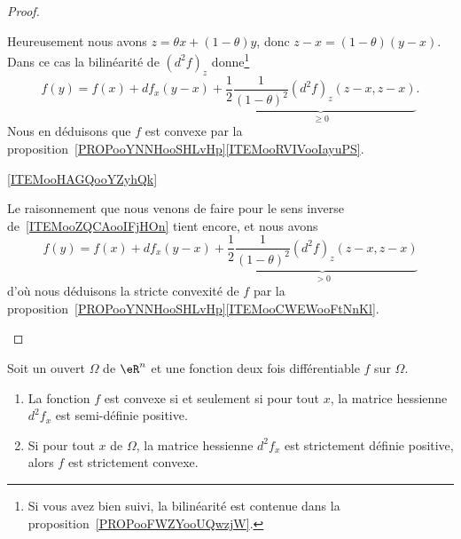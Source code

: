 \begin{proof}
\begin{subproof}
        Heureusement nous avons \( z=\theta x+(1-\theta)y\), donc \( z-x=(1-\theta)(y-x)\). Dans ce cas la bilinéarité de \( (d^2f)_z\) donne\footnote{Si vous avez bien suivi, la bilinéarité est contenue dans la proposition~\ref{PROPooFWZYooUQwzjW}.}
        \begin{equation}
            f(y)=f(x)+df_x(y-x)+\underbrace{\frac{ 1 }{2}\frac{1}{ (1-\theta)^2 }(d^2f)_z(z-x,z-x)}_{\geq 0}.
        \end{equation}
        Nous en déduisons que \( f\) est convexe par la proposition~\ref{PROPooYNNHooSHLvHp}\ref{ITEMooRVIVooIayuPS}.
    \item[\ref{ITEMooHAGQooYZyhQk}]

        Le raisonnement que nous venons de faire pour le sens inverse de~\ref{ITEMooZQCAooIFjHOn} tient encore, et nous avons
        \begin{equation}
            f(y)=f(x)+df_x(y-x)+\underbrace{\frac{ 1 }{2}\frac{1}{ (1-\theta)^2 }(d^2f)_z(z-x,z-x)}_{> 0}
        \end{equation}
        d'où nous déduisons la stricte convexité de \( f\) par la proposition~\ref{PROPooYNNHooSHLvHp}\ref{ITEMooCWEWooFtNnKl}.
    \end{subproof}
\end{proof}

\begin{corollary}       \label{CORooMBQMooWBAIIH}
    Soit un ouvert \( \Omega\) de \( \eR^n\) et une fonction deux fois différentiable \( f\) sur \( \Omega\).
    \begin{enumerate}
        \item   \label{ITEMooUAFTooXfCviI}
            La fonction \( f\) est convexe si et seulement si pour tout \( x\), la matrice hessienne \( d^2f_x\) est semi-définie positive.
        \item   \label{ITEMooDGISooPlRLOd}
            Si pour tout \( x\) de \( \Omega\), la matrice hessienne \( d^2f_x\) est strictement définie positive, alors \( f \) est strictement convexe.
    \end{enumerate}
\end{corollary}


